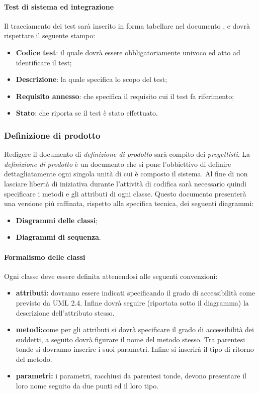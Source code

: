 \paragraph{Test di sistema ed integrazione}
Il tracciamento dei test sarà inserito in forma tabellare nel documento \PianoDiQualifica, e dovrà rispettare il seguente stampo:
\begin{itemize}
\item \textbf{Codice test}: il quale dovrà essere obbligatoriamente univoco ed atto ad identificare il test;
\item \textbf{Descrizione}: la quale specifica lo scopo del test;
\item \textbf{Requisito annesso}: che specifica il requisito cui il test fa riferimento;
\item \textbf{Stato}: che riporta se il test è stato effettuato.
\end{itemize}

\subsubsection{Definizione di prodotto}
Redigere il documento di \textit{definizione di prodotto} sarà compito dei \textit{progettisti}.
La \textit{definizione di prodotto} è un documento che si pone l'obbiettivo di definire dettagliatamente ogni singola unità di cui è composto il sistema. Al fine di non lasciare libertà di iniziativa durante l'attività di codifica sarà necessario quindi specificare i metodi e gli  attributi di ogni classe.
Questo documento presenterà una versione più raffinata, rispetto alla specifica tecnica, dei seguenti diagrammi:
\begin{itemize}
\item \textbf{Diagrammi delle classi};
\item \textbf{Diagrammi di sequenza}.
\end{itemize}
\paragraph{Formalismo delle classi}
Ogni classe deve essere definita attenendosi alle seguenti convenzioni:
\begin{itemize}
\item \textbf{attributi:} dovranno essere indicati specificando il grado di accessibilità come previsto da UML 2.4. Infine dovrà seguire (riportata sotto il diagramma) la descrizione dell’attributo stesso.
\item \textbf{metodi:}come per gli attributi si dovrà specificare il grado di accessibilità dei
suddetti, a seguito dovrà figurare il nome del metodo stesso. Tra parentesi tonde si
dovranno inserire i suoi parametri. Infine si inserirà il tipo di ritorno del metodo.
\item \textbf{parametri:} i parametri, racchiusi da parentesi tonde, devono presentare il loro nome seguito da due punti ed il loro tipo.
\end{itemize}
